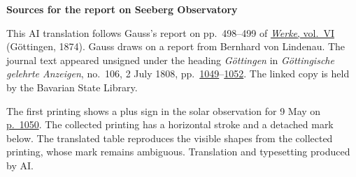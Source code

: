 \clearpage\thispagestyle{empty}
\begin{center}\textbf{Sources for the report on Seeberg Observatory}\end{center}
\noindent This AI translation follows Gauss’s report on pp.~498--499 of \href{https://gdz.sub.uni-goettingen.de/id/PPN236007467}{\textit{Werke}, vol.~VI} (Göttingen, 1874). Gauss draws on a report from Bernhard von Lindenau. The journal text appeared unsigned under the heading \emph{Göttingen} in \textit{Göttingische gelehrte Anzeigen}, no.~106, 2 July 1808, pp.~\href{https://api.digitale-sammlungen.de/iiif/image/v2/bsb10538674_00017/full/1800,/0/default.jpg}{1049}--\href{https://api.digitale-sammlungen.de/iiif/image/v2/bsb10538674_00020/full/1800,/0/default.jpg}{1052}. The linked copy is held by the Bavarian State Library.
\par\smallskip\noindent The first printing shows a plus sign in the solar observation for 9 May on \href{https://api.digitale-sammlungen.de/iiif/image/v2/bsb10538674_00018/full/1800,/0/default.jpg}{p.~1050}. The collected printing has a horizontal stroke and a detached mark below. The translated table reproduces the visible shapes from the collected printing, whose mark remains ambiguous. Translation and typesetting produced by AI.
\clearpage

